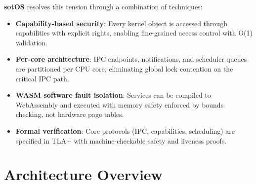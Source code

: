\documentclass[11pt,letterpaper]{article}
\theoremstyle{definition}
\begin{document}
\textbf{sotOS} resolves this tension through a combination of techniques:
\begin{itemize}[nosep]
    \item \textbf{Capability-based security}: Every kernel object is accessed
          through capabilities with explicit rights, enabling fine-grained
          access control with O(1) validation.
    \item \textbf{Per-core architecture}: IPC endpoints, notifications, and
          scheduler queues are partitioned per CPU core, eliminating global
          lock contention on the critical IPC path.
    \item \textbf{WASM software fault isolation}: Services can be compiled to
          WebAssembly and executed with memory safety enforced by bounds
          checking, not hardware page tables.
    \item \textbf{Formal verification}: Core protocols (IPC, capabilities,
          scheduling) are specified in TLA+ with machine-checkable safety and
          liveness proofs.
\end{itemize}

\section{Architecture Overview}
\end{document}
